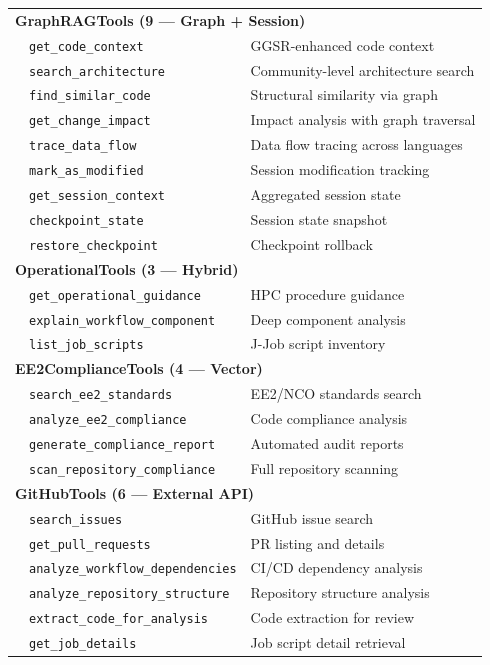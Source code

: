 \documentclass[11pt,letterpaper]{article}
\begin{document}
\begin{longtable}{@{}llp{5.5cm}@{}}
\multicolumn{3}{l}{\textbf{GraphRAGTools (9 --- Graph + Session)}} \\
& \texttt{get\_code\_context} & GGSR-enhanced code context \\
& \texttt{search\_architecture} & Community-level architecture search \\
& \texttt{find\_similar\_code} & Structural similarity via graph \\
& \texttt{get\_change\_impact} & Impact analysis with graph traversal \\
& \texttt{trace\_data\_flow} & Data flow tracing across languages \\
& \texttt{mark\_as\_modified} & Session modification tracking \\
& \texttt{get\_session\_context} & Aggregated session state \\
& \texttt{checkpoint\_state} & Session state snapshot \\
& \texttt{restore\_checkpoint} & Checkpoint rollback \\
\midrule

\multicolumn{3}{l}{\textbf{OperationalTools (3 --- Hybrid)}} \\
& \texttt{get\_operational\_guidance} & HPC procedure guidance \\
& \texttt{explain\_workflow\_component} & Deep component analysis \\
& \texttt{list\_job\_scripts} & J-Job script inventory \\
\midrule

\multicolumn{3}{l}{\textbf{EE2ComplianceTools (4 --- Vector)}} \\
& \texttt{search\_ee2\_standards} & EE2/NCO standards search \\
& \texttt{analyze\_ee2\_compliance} & Code compliance analysis \\
& \texttt{generate\_compliance\_report} & Automated audit reports \\
& \texttt{scan\_repository\_compliance} & Full repository scanning \\
\midrule

\multicolumn{3}{l}{\textbf{GitHubTools (6 --- External API)}} \\
& \texttt{search\_issues} & GitHub issue search \\
& \texttt{get\_pull\_requests} & PR listing and details \\
& \texttt{analyze\_workflow\_dependencies} & CI/CD dependency analysis \\
& \texttt{analyze\_repository\_structure} & Repository structure analysis \\
& \texttt{extract\_code\_for\_analysis} & Code extraction for review \\
& \texttt{get\_job\_details} & Job script detail retrieval \\
\midrule


\end{longtable}
\end{document}

